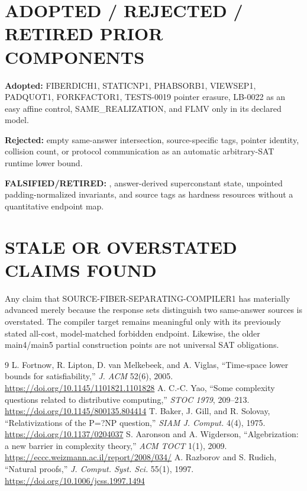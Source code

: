 \documentclass[11pt]{article}
\newcommand{\claim}[1]{\texttt{\detokenize{#1}}}
\begin{document}
\section{ADOPTED / REJECTED / RETIRED PRIOR COMPONENTS}

\textbf{Adopted:} FIBERDICH1, STATICNP1, PHABSORB1, VIEWSEP1, PADQUOT1,
FORKFACTOR1, TESTS-0019 pointer erasure, LB-0022 as an easy affine control,
SAME\_REALIZATION, and FLMV only in its declared model.

\textbf{Rejected:} empty same-answer intersection, source-specific tags,
pointer identity, collision count, or protocol communication as an automatic
arbitrary-SAT runtime lower bound.

\textbf{FALSIFIED/RETIRED:} \claim{FIBER-SEPARATION-AS-OBSTRUCTION1},
answer-derived superconstant state, unpointed padding-normalized invariants,
and source tags as hardness resources without a quantitative endpoint map.

\section{STALE OR OVERSTATED CLAIMS FOUND}

Any claim that SOURCE-FIBER-SEPARATING-COMPILER1 has materially advanced
merely because the response sets distinguish two same-answer sources is
overstated.  The compiler target remains meaningful only with its previously
stated all-cost, model-matched forbidden endpoint.  Likewise, the older
main4/main5 partial construction points are not universal SAT obligations.

\begin{thebibliography}{9}
 L. Fortnow, R. Lipton, D. van Melkebeek, and A. Viglas,
``Time-space lower bounds for satisfiability,'' \emph{J. ACM} 52(6), 2005.
\url{https://doi.org/10.1145/1101821.1101828}
 A. C.-C. Yao, ``Some complexity questions related to
distributive computing,'' \emph{STOC 1979}, 209--213.
\url{https://doi.org/10.1145/800135.804414}
 T. Baker, J. Gill, and R. Solovay,
``Relativizations of the P=?NP question,'' \emph{SIAM J. Comput.} 4(4), 1975.
\url{https://doi.org/10.1137/0204037}
 S. Aaronson and A. Wigderson,
``Algebrization: a new barrier in complexity theory,'' \emph{ACM TOCT} 1(1), 2009.
\url{https://eccc.weizmann.ac.il/report/2008/034/}
 A. Razborov and S. Rudich, ``Natural proofs,''
\emph{J. Comput. Syst. Sci.} 55(1), 1997.
\url{https://doi.org/10.1006/jcss.1997.1494}
\end{thebibliography}

\end{document}
